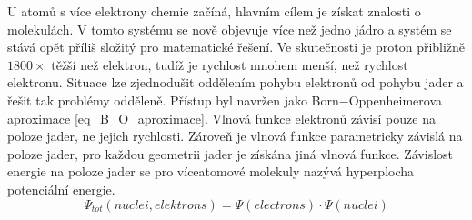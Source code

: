 \documentclass[
  digital, %
  table,   %
  lof,     %
  lot,     %
]{fithesis3}
\begin{document}
U atomů s více  elektrony chemie začíná, hlavním cílem je získat znalosti o molekulách. V tomto systému se nově objevuje více než jedno jádro a systém se stává opět příliš složitý pro matematické řešení. Ve skutečnosti je proton přibližně $1800 \times$ těžší než elektron, tudíž je rychlost mnohem menší, než rychlost elektronu. Situace lze zjednodušit oddělením pohybu elektronů od pohybu jader a řešit tak problémy odděleně. Přístup byl navržen jako Born$-$Oppenheimerova aproximace \ref{eq_B_O_aproximace}. Vlnová funkce elektronů závisí pouze na poloze jader, ne jejich rychlosti.\cite{lechamolecularmodeling} Zároveň je vlnová funkce parametricky závislá na poloze jader, pro každou geometrii jader je získána jiná vlnová funkce. Závislost energie na poloze jader se pro víceatomové molekuly nazývá hyperplocha potenciální energie. \cite{dftshrnutivysledky}
\begin{equation}
\Psi_{tot}(nuclei, elektrons) = \Psi(electrons) \cdot \Psi(nuclei)
\label{eq_B_O_aproximace} 
\end{equation}
\end{document}
